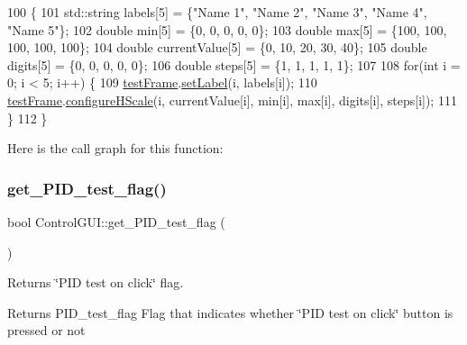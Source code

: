 \begin{DoxyCode}
100                                     \{
101     std::string labels[5] = \{\textcolor{stringliteral}{"Name 1"}, \textcolor{stringliteral}{"Name 2"}, \textcolor{stringliteral}{"Name 3"}, \textcolor{stringliteral}{"Name 4"}, \textcolor{stringliteral}{"Name 5"}\};
102     \textcolor{keywordtype}{double} min[5] = \{0, 0, 0, 0, 0\};
103     \textcolor{keywordtype}{double} max[5] = \{100, 100, 100, 100, 100\};
104     \textcolor{keywordtype}{double} currentValue[5] = \{0, 10, 20, 30, 40\};
105     \textcolor{keywordtype}{double} digits[5] = \{0, 0, 0, 0, 0\};
106     \textcolor{keywordtype}{double} steps[5] = \{1, 1, 1, 1, 1\};
107 
108     \textcolor{keywordflow}{for}(\textcolor{keywordtype}{int} i = 0; i < 5; i++) \{
109         \hyperlink{class_control_g_u_i_a0c644077833274625d1ff044e2abdb42}{testFrame}.\hyperlink{class_test_frame_a125817ea431fb013eaf2b9f11714bd9b}{setLabel}(i, labels[i]);
110         \hyperlink{class_control_g_u_i_a0c644077833274625d1ff044e2abdb42}{testFrame}.\hyperlink{class_test_frame_a11a2d806abe566abbc431bff4b43ab79}{configureHScale}(i, currentValue[i],  min[i], max[i], digits[i], 
      steps[i]);
111     \}
112 \}
\end{DoxyCode}
Here is the call graph for this function\+:
\mbox{\label{class_control_g_u_i_a7374bda9d4cf28b1374760c82f5f684c}} 
\subsubsection{\texorpdfstring{get\+\_\+\+P\+I\+D\+\_\+test\+\_\+flag()}{get\_PID\_test\_flag()}}
{\footnotesize\ttfamily bool Control\+G\+U\+I\+::get\+\_\+\+P\+I\+D\+\_\+test\+\_\+flag (\begin{DoxyParamCaption}{ }\end{DoxyParamCaption})}



Returns \char`\"{}\+P\+I\+D test on click\char`\"{} flag. 

\begin{DoxyReturn}{Returns}
P\+I\+D\+\_\+test\+\_\+flag Flag that indicates whether \char`\"{}\+P\+I\+D test on click\char`\"{} button is pressed or not 
\end{DoxyReturn}


